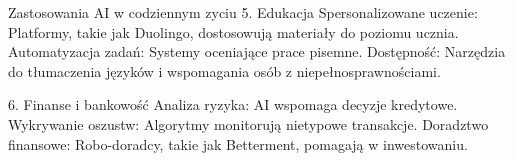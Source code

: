 \begin{frame}{Zastosowania AI w codziennym zyciu}
5. Edukacja
Spersonalizowane uczenie:
Platformy, takie jak Duolingo, dostosowują materiały do poziomu ucznia.
Automatyzacja zadań: 
Systemy oceniające prace pisemne.
Dostępność: 
Narzędzia do tłumaczenia języków i wspomagania osób z niepełnosprawnościami.

6. Finanse i bankowość
Analiza ryzyka: 
AI wspomaga decyzje kredytowe.
Wykrywanie oszustw: 
Algorytmy monitorują nietypowe transakcje.
Doradztwo finansowe:
Robo-doradcy, takie jak Betterment, pomagają w inwestowaniu.
\end{frame}
